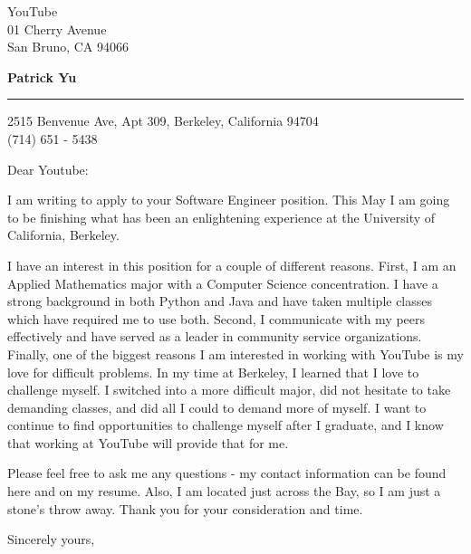 \documentclass{letter} %
\begin{document}
\signature{Patrick Yu}           %
\longindentation=0pt                       %
\let\raggedleft\raggedright                %
 
 
\begin{letter}{
YouTube\\
01 Cherry Avenue\\
San Bruno, CA 94066}


\begin{flushleft}
{\large\bf Patrick Yu}
\end{flushleft}
\medskip\hrule height 1pt
\begin{flushright}
\hfill 2515 Benvenue Ave, Apt 309, Berkeley, California 94704 \\
\hfill (714) 651 - 5438
\end{flushright} 
\vfill %

 
\opening{Dear Youtube:} 
 
\noindent I am writing to apply to your Software Engineer position. This May I am going to be finishing what has been an enlightening experience at the University of California, Berkeley.

\noindent I have an interest in this position for a couple of different reasons. First, I am an Applied Mathematics major with a Computer Science concentration. I have a strong background in both Python and Java and have taken multiple classes which have required me to use both.  Second, I communicate with my peers effectively and have served as a leader in community service organizations. Finally, one of the biggest reasons I am interested in working with YouTube is my love for difficult problems. In my time at Berkeley, I learned that I love to challenge myself. I switched into a more difficult major, did not hesitate to take demanding classes, and did all I could to demand more of myself. I want to continue to find opportunities to challenge myself after I graduate, and I know that working at YouTube will provide that for me.

\noindent Please feel free to ask me any questions - my contact information can be found here and on my resume. Also, I am located just across the Bay, so I am just a stone's throw away. Thank you for your consideration and time.
 
\closing{Sincerely yours,} 
 

 

\end{letter}
 
\end{document}
